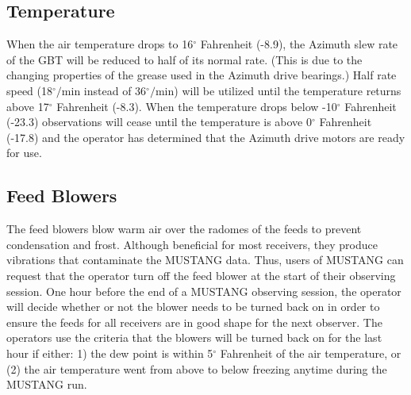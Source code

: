 \subsection{Temperature}

When the air temperature drops to 16$^\circ$ Fahrenheit (-8.9\celsius),
the Azimuth slew rate of the GBT will be reduced to half of its normal
rate.  (This is due to the changing properties of the grease used in
the Azimuth drive bearings.)  Half rate speed (18$^\circ/$min instead
of 36$^\circ/$min) will be utilized until the temperature returns above
17$^\circ$ Fahrenheit (-8.3\celsius).
When the temperature drops below -10$^\circ$ Fahrenheit (-23.3\celsius)
observations will cease until the temperature is above 0$^\circ$ 
Fahrenheit (-17.8\celsius) and the operator has determined that the
Azimuth drive motors are ready for use.


\subsection{Feed Blowers}

The feed blowers blow warm air over the radomes of the feeds to 
prevent condensation and frost.  Although beneficial for most receivers,
they produce vibrations that contaminate the MUSTANG data.
Thus, users of MUSTANG can request that the operator turn off the feed blower
at the start of their observing session.  One hour before the end of a
MUSTANG observing session, the operator will decide whether or not the
blower needs to be turned back on in order to ensure the feeds for all
receivers are in good shape for the next observer.  The operators use
the criteria that the blowers will be turned back on for the last hour
if either: 1) the dew point is within 5$^\circ$ Fahrenheit of the air
temperature, or (2) the air temperature went from above to below
freezing anytime during the MUSTANG run.
